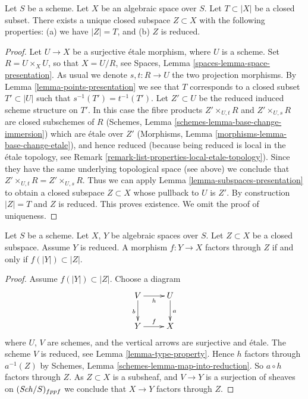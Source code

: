 \begin{lemma}
\label{lemma-reduced-closed-subspace}
Let $S$ be a scheme.
Let $X$ be an algebraic space over $S$.
Let $T \subset |X|$ be a closed subset.
There exists a unique closed subspace $Z \subset X$ with
the following properties: (a) we have $|Z| = T$, and (b) $Z$ is reduced.
\end{lemma}

\begin{proof}
Let $U \to X$ be a surjective \'etale morphism, where $U$ is a scheme.
Set $R = U \times_X U$, so that $X = U/R$, see
Spaces, Lemma \ref{spaces-lemma-space-presentation}.
As usual we denote $s, t : R \to U$ the two projection morphisms.
By Lemma \ref{lemma-points-presentation}
we see that $T$ corresponds to a closed subset $T' \subset |U|$ such
that $s^{-1}(T') = t^{-1}(T')$.
Let $Z' \subset U$ be the reduced induced scheme structure on $T'$.
In this case the fibre products
$Z' \times_{U, t} R$ and $Z' \times_{U, s} R$ are closed subschemes
of $R$
(Schemes, Lemma \ref{schemes-lemma-base-change-immersion})
which are \'etale over $Z'$
(Morphisms, Lemma \ref{morphisms-lemma-base-change-etale}),
and hence reduced
(because being reduced is local in the \'etale topology, see
Remark \ref{remark-list-properties-local-etale-topology}).
Since they have the same underlying topological space (see above)
we conclude that $Z' \times_{U, t} R = Z' \times_{U, s} R$.
Thus we can apply Lemma \ref{lemma-subspaces-presentation}
to obtain a closed subspace $Z \subset X$ whose pullback to $U$ is $Z'$.
By construction $|Z| = T$ and $Z$ is reduced. This proves existence.
We omit the proof of uniqueness.
\end{proof}

\begin{lemma}
\label{lemma-map-into-reduction}
Let $S$ be a scheme.
Let $X$, $Y$ be algebraic spaces over $S$.
Let $Z \subset X$ be a closed subspace.
Assume $Y$ is reduced.
A morphism $f : Y \to X$ factors through $Z$ if and only if
$f(|Y|) \subset |Z|$.
\end{lemma}

\begin{proof}
Assume $f(|Y|) \subset |Z|$. Choose a diagram
$$
\xymatrix{
V \ar[d]_b \ar[r]_h & U \ar[d]^a \\
Y \ar[r]^f & X
}
$$
where $U$, $V$ are schemes, and the vertical arrows are surjective and
\'etale. The scheme $V$ is reduced, see
Lemma \ref{lemma-type-property}.
Hence $h$ factors through $a^{-1}(Z)$ by
Schemes, Lemma \ref{schemes-lemma-map-into-reduction}.
So $a \circ h$ factors through $Z$.
As $Z \subset X$ is a subsheaf, and $V \to Y$ is a surjection of sheaves
on $(\mathit{Sch}/S)_{fppf}$ we conclude that $X \to Y$ factors
through $Z$.
\end{proof}


